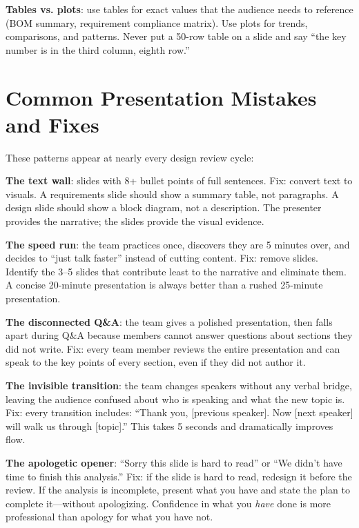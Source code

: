 \textbf{Tables vs. plots}: use tables for exact values that the audience needs to reference (BOM summary, requirement compliance matrix). Use plots for trends, comparisons, and patterns. Never put a 50-row table on a slide and say ``the key number is in the third column, eighth row.''



\section{Common Presentation Mistakes and Fixes}
These patterns appear at nearly every design review cycle:

\textbf{The text wall}: slides with 8+ bullet points of full sentences. Fix: convert text to visuals. A requirements slide should show a summary table, not paragraphs. A design slide should show a block diagram, not a description. The presenter provides the narrative; the slides provide the visual evidence.

\textbf{The speed run}: the team practices once, discovers they are 5 minutes over, and decides to ``just talk faster'' instead of cutting content. Fix: remove slides. Identify the 3--5 slides that contribute least to the narrative and eliminate them. A concise 20-minute presentation is always better than a rushed 25-minute presentation.

\textbf{The disconnected Q\&A}: the team gives a polished presentation, then falls apart during Q\&A because members cannot answer questions about sections they did not write. Fix: every team member reviews the entire presentation and can speak to the key points of every section, even if they did not author it.

\textbf{The invisible transition}: the team changes speakers without any verbal bridge, leaving the audience confused about who is speaking and what the new topic is. Fix: every transition includes: ``Thank you, [previous speaker]. Now [next speaker] will walk us through [topic].'' This takes 5 seconds and dramatically improves flow.

\textbf{The apologetic opener}: ``Sorry this slide is hard to read'' or ``We didn't have time to finish this analysis.'' Fix: if the slide is hard to read, redesign it before the review. If the analysis is incomplete, present what you have and state the plan to complete it---without apologizing. Confidence in what you \emph{have} done is more professional than apology for what you have not.


